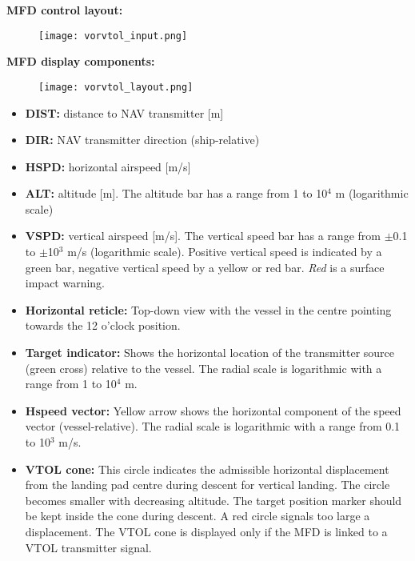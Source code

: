 \documentclass[Orbiter User Manual.tex]{subfiles}
\begin{document}
\noindent
\textbf{MFD control layout:}

\begin{figure}[H]
  \centering
  \texttt{[image: vorvtol\_input.png]}
\end{figure}

\noindent
\textbf{MFD display components:}

\begin{figure}[H]
  \centering
  \texttt{[image: vorvtol\_layout.png]}
\end{figure}

\begin{itemize}
\item \textbf{DIST:} distance to NAV transmitter [m]
\item \textbf{DIR:} NAV transmitter direction (ship-relative)
\item \textbf{HSPD:} horizontal airspeed [m/s]
\item \textbf{ALT:} altitude [m]. The altitude bar has a range from 1 to 10$^{4}$ m (logarithmic scale)
\item \textbf{VSPD:} vertical airspeed [m/s]. The vertical speed bar has a range from $\pm$0.1 to $\pm$10$^{3}$ m/s (logarithmic scale). Positive vertical speed is indicated by a green bar, negative vertical speed by a yellow or red bar. \textit{Red} is a surface impact warning.
\item \textbf{Horizontal reticle:} Top-down view with the vessel in the centre pointing towards the 12 o'clock position. 
\item \textbf{Target indicator:} Shows the horizontal location of the transmitter source (green cross) relative to the vessel. The radial scale is logarithmic with a range from 1 to 10$^{4}$ m.
\item \textbf{Hspeed vector:} Yellow arrow shows the horizontal component of the speed vector (vessel-relative). The radial scale is logarithmic with a range from 0.1 to 10$^{3}$ m/s.
\item \textbf{VTOL cone:} This circle indicates the admissible horizontal displacement from the landing pad centre during descent for vertical landing. The circle becomes smaller with decreasing altitude. The target position marker should be kept inside the cone during descent. A red circle signals too large a displacement. The VTOL cone is displayed only if the MFD is linked to a VTOL transmitter signal.
\end{itemize}
\end{document}

